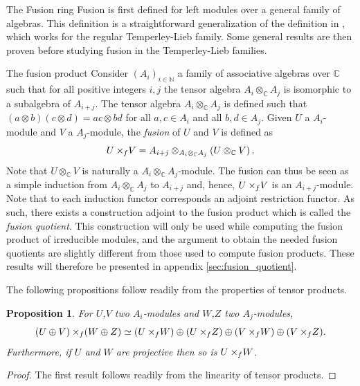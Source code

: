 \documentclass[reqno]{amsart}
\newtheorem{Prop}[Thm]{Proposition}
\newcommand{\xf}{\times\hspace{-0.27em}_f}
\begin{document}
\begin{section}{The Fusion ring}\label{sec:deffusion}
Fusion is first defined for left modules over a general family of algebras. This definition is a straightforward generalization of the definition in \cite{ReadSaleur1,ReadSaleur2,GainVass}, which works for the regular Temperley-Lieb family. Some general results are then proven before studying fusion in the Temperley-Lieb families.
\begin{subsection}{The fusion product}
Consider $(A_i)_{i \in \mathbb{N}}$ a family of associative algebras over $\mathbb{C}$ such that for all positive integers $i,j$ the tensor algebra $A_{i} \otimes_{\mathbb{C}} A_{j}$ is isomorphic to a subalgebra of $A_{i+j}$. The tensor algebra  $A_{i} \otimes_{\mathbb{C}} A_{j}$ is defined such that $(a \otimes b)(c\otimes d) = ac \otimes bd$ for all $a,c \in A_{i}$ and all $b,d \in A_{j}$. Given $U$ a $A_{i}$-module and $V$ a $A_{j}$-module, the \emph{fusion} of $U$ and $V$ is defined as 
\begin{equation}
U \xf V = A_{i+j} \otimes_{A_{i}\otimes_{\mathbb{C}} A_{j}}\left( U \otimes_{\mathbb{C}} V \right)\text{.}
\end{equation}
Note that $U \otimes_{\mathbb{C}} V$ is naturally a $A_{i}\otimes_{\mathbb{C}} A_{j}$-module. The fusion can thus be seen as a simple induction from $A_{i}\otimes_{\mathbb{C}} A_{j}$ to $A_{i+j}$ and, hence, $U \xf V$ is an $A_{i+j}$-module. Note that to each induction functor corresponds an adjoint restriction functor. As such, there exists a construction adjoint to the fusion product which is called the \emph{fusion quotient}. This construction will only be used while computing the fusion product of irreducible modules, and the argument to obtain the needed fusion quotients are slightly different from those used to compute fusion products. These results will therefore be presented in appendix \ref{sec:fusion_quotient}.

 The following propositions follow readily from the properties of tensor products.
\begin{Prop}\label{prop:fusion_resproj}
For $U$,$V$ two $A_{i}$-modules and $W$,$Z$ two $A_{j}$-modules, $$(U\oplus V)\xf(W\oplus Z) \simeq (U\xf W) \oplus (U \xf Z) \oplus (V\xf W) \oplus (V\xf Z) \text{.}$$Furthermore, if $U$ and $W$ are projective then so is $U\xf W$.
\end{Prop}
\begin{proof}
The first result follows readily from the linearity of tensor products.


\end{proof}
\end{subsection}
\end{section}
\end{document}
